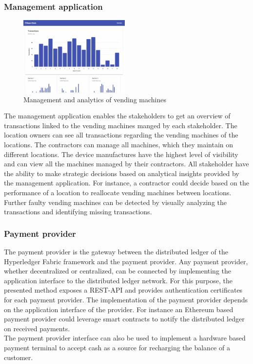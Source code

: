 \subsubsection{Management application}
\begin{figure}[ht]
\centering
  \includegraphics[width=0.49\textwidth]{assets/managment.png}
\caption{Management and analytics of vending machines}
\label{fig:management}
\end{figure}
The management application enables the stakeholders to get an overview of transactions linked to the vending machines manged by each stakeholder. The location owners can see all transactions regarding the vending machines of the locations. The contractors can manage all machines, which they maintain on different locations. The device manufactures have the highest level of visibility and can view  all the machines managed by their contractors. All stakeholder have the ability to make strategic decisions based on analytical insights provided by the management application. For instance, a contractor could decide based on the performance of a location to reallocate vending machines between locations. Further faulty vending machines can be detected by visually analyzing the transactions and identifying missing transactions.

\subsubsection{Payment provider}
The payment provider is the gateway between the distributed ledger of the Hyperledger Fabric framework and the payment provider. Any payment provider, whether decentralized or centralized, can be connected by implementing the application interface to the distributed ledger network. For this purpose, the presented method exposes a REST-API and provides authentication certificates for each payment provider. The implementation of the payment provider depends on the application interface of the provider. For instance an Ethereum based payment provider could leverage smart contracts to notify the distributed ledger on received payments. \\
The payment provider interface can also be used to implement a hardware based payment terminal to accept cash as a source for recharging the balance of a customer.
